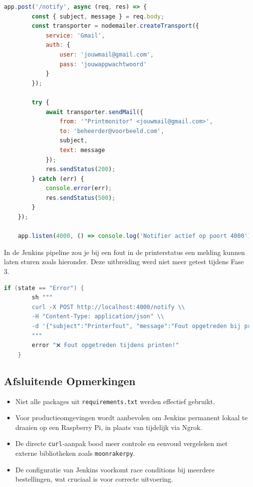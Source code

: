 \begin{enumerate}
\begin{lstlisting}[language=javascript, caption=Express-server voor foutnotificatie per e-mail]
    app.post('/notify', async (req, res) => {
        const { subject, message } = req.body;
        const transporter = nodemailer.createTransport({
            service: 'Gmail',
            auth: {
                user: 'jouwmail@gmail.com',
                pass: 'jouwappwachtwoord'
            }
        });
        
        try {
            await transporter.sendMail({
                from: '"Printmonitor" <jouwmail@gmail.com>',
                to: 'beheerder@voorbeeld.com',
                subject,
                text: message
            });
            res.sendStatus(200);
        } catch (err) {
            console.error(err);
            res.sendStatus(500);
        }
    });
    
    app.listen(4000, () => console.log('Notifier actief op poort 4000'));
\end{lstlisting}

In de Jenkins pipeline zou je bij een fout in de printerstatus een melding kunnen laten sturen zoals hieronder. Deze uitbreiding werd niet meer getest tijdens Fase 3.

\begin{lstlisting}[language=groovy]
    if (state == "Error") {
        sh """
        curl -X POST http://localhost:4000/notify \\
        -H "Content-Type: application/json" \\
        -d '{"subject":"Printerfout", "message":"Fout opgetreden bij printen van ${bestandNaam}."}'
        """
        error "❌ Fout opgetreden tijdens printen!"
    }
\end{lstlisting}

\subsection{Afsluitende Opmerkingen}
\begin{itemize}
    \item Niet alle packages uit \texttt{requirements.txt} werden effectief gebruikt.
    \item Voor productieomgevingen wordt aanbevolen om Jenkins permanent lokaal te draaien op een Raspberry Pi, in plaats van tijdelijk via Ngrok.
    \item De directe \texttt{curl}-aanpak bood meer controle en eenvoud vergeleken met externe bibliotheken zoals \texttt{moonrakerpy}.
    \item De configuratie van Jenkins voorkomt race conditions bij meerdere bestellingen, wat cruciaal is voor correcte uitvoering.
\end{itemize}


\end{enumerate}
